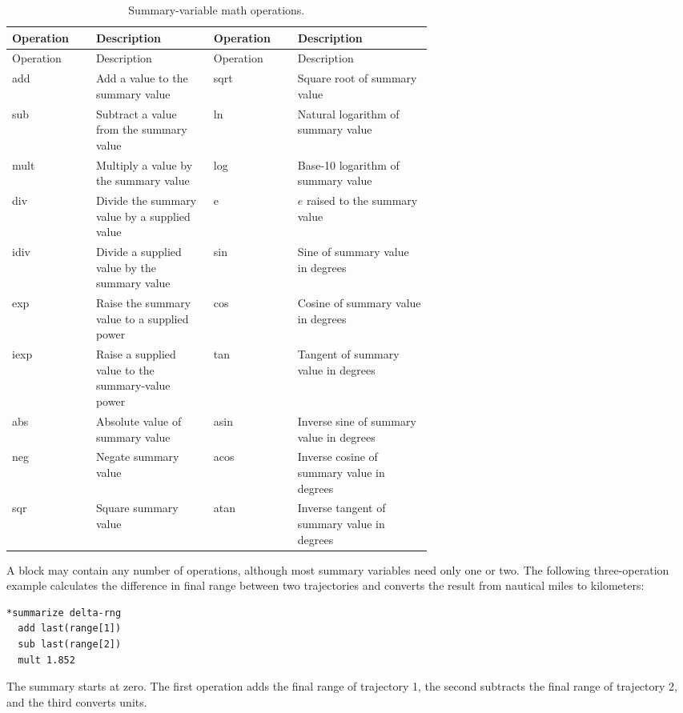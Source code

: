 \begin{longtable}{@{}>{\ttfamily}lp{0.29\linewidth}>{\ttfamily}lp{0.32\linewidth}@{}}
  \caption{Summary-variable math operations.}
  \label{tab:summary-math-operations}\\
  \toprule
  \normalfont Operation & Description & \normalfont Operation & Description \\
  \midrule
  \endfirsthead
  \toprule
  \normalfont Operation & Description & \normalfont Operation & Description \\
  \midrule
  \endhead
  add  & Add a value to the summary value & sqrt & Square root of summary value \\
  sub  & Subtract a value from the summary value & ln & Natural logarithm of summary value \\
  mult & Multiply a value by the summary value & log & Base-10 logarithm of summary value \\
  div  & Divide the summary value by a supplied value & e & $e$ raised to the summary value \\
  idiv & Divide a supplied value by the summary value & sin & Sine of summary value in degrees \\
  exp  & Raise the summary value to a supplied power & cos & Cosine of summary value in degrees \\
  iexp & Raise a supplied value to the summary-value power & tan & Tangent of summary value in degrees \\
  abs  & Absolute value of summary value & asin & Inverse sine of summary value in degrees \\
  neg  & Negate summary value & acos & Inverse cosine of summary value in degrees \\
  sqr  & Square summary value & atan & Inverse tangent of summary value in degrees \\
  \bottomrule
\end{longtable}

A block may contain any number of operations, although most summary variables need
only one or two. The following three-operation example calculates the difference in
final range between two trajectories and converts the result from nautical miles to
kilometers:

\begin{lstlisting}[style=taosmanual]
*summarize delta-rng
  add last(range[1])
  sub last(range[2])
  mult 1.852
\end{lstlisting}

The summary starts at zero. The first operation adds the final range of trajectory 1,
the second subtracts the final range of trajectory 2, and the third converts units.

